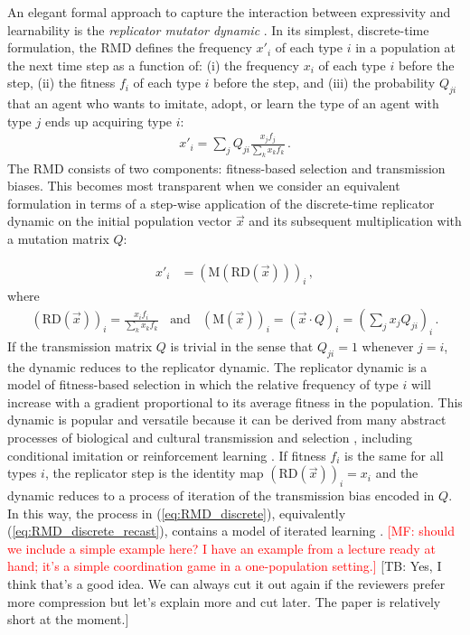 \documentclass[a4paper]{article}
\newcommand{\mf}[1]{\textcolor{Red}{[MF: #1]}}
\newcommand{\tb}[1]{\textcolor[rgb]{.8,.33,.0}{[TB: #1]}}%
\begin{document}
An elegant formal approach to capture the interaction between expressivity and learnability
is the \emph{replicator mutator dynamic}
\citep{Hofbauer1985:The-Selection-M,nowak+etal:2000,NowakKomarova2001:Evolution-of-Un,hofbauer+sigmund:2003,Nowak2006:Evolutionary-Dy}. In
its simplest, discrete-time formulation, the RMD defines the frequency $x'_i$ of each type $i$
in a population at the next time step as a function of: (i) the frequency $x_i$ of each type
$i$ before the step, (ii) the fitness $f_i$ of each type $i$ before the step, and (iii) the
probability $Q_{ji}$ that an agent who wants to imitate, adopt, or learn the type of an agent
with type $j$ ends up acquiring type $i$:
\begin{align}
  \label{eq:RMD_discrete}
  x'_i = \sum_j Q_{ji} \frac{x_jf_j}{\sum_k x_k f_k}\,.
\end{align}
The RMD consists of two components: fitness-based selection and transmission biases. This
becomes most transparent when we consider an equivalent formulation in terms of a step-wise
application of the discrete-time replicator dynamic \citep{TaylorJonker1978:Evolutionary-St} on the initial population vector $\vec{x}$
and its subsequent multiplication with a mutation matrix $Q$:

\begin{align}
  \label{eq:RMD_discrete_recast}
  x'_i & = (\text{M}(\text{RD}(\vec{x})))_i\,,
\end{align}
where
\begin{align*}
      \left ( \text{RD}(\vec{x}) \right )_i 
         = \frac{x_i f_i}{\sum_k x_k f_k}
 \ \ \ \ \text{and} \ \ \ \ 
  (\text{M}(\vec{x}))_i = (\vec{x} \cdot Q)_i = \left ( \sum_j
          x_j Q_{ji} \right)_i\,.
\end{align*}
If the transmission matrix $Q$ is trivial in the sense that $Q_{ji}=1$ whenever $j=i$, the
dynamic reduces to the replicator dynamic. The replicator dynamic is a model of fitness-based
selection in which the relative frequency of type $i$ will increase with a gradient
proportional to its average fitness in the population. This dynamic is popular and
versatile because it can be derived from many abstract processes of biological and cultural
transmission and selection \citep[for overview and several derivations
see][]{Sandholm2010:Population-Game}, including conditional imitation
\citep[e.g.,][]{Helbing1996:A-Stochastic-Be,Schlag1998:Why-Imitate-and} or reinforcement
learning \citep[e.g.,][]{BorgersSarin997:Learning-Throug,Beggs2005:On-the-Converge}. If fitness
$f_i$ is the same for all types $i$, the replicator step is the identity map
$ \left ( \text{RD}(\vec{x}) \right )_i = x_i$ and the dynamic reduces to a process of
iteration of the transmission bias encoded in $Q$. In this way, the process in
(\ref{eq:RMD_discrete}), equivalently (\ref{eq:RMD_discrete_recast}), contains a model of
iterated learning \citep{griffiths+kalish:2007}. \mf{should we include a simple example here? I 
have an example from a lecture ready at hand; it's a simple coordination game in a
one-population setting.} \tb{Yes, I think that's a good idea. We can always cut it out again if the reviewers prefer more compression but let's explain more and cut later. The paper is relatively short at the moment.} 
\end{document}
